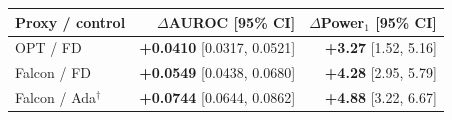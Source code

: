 \begin{tabular}{@{}lrr@{}}
\toprule
Proxy / control & $\Delta$AUROC [95\% CI] & $\Delta$Power$_1$ [95\% CI] \\
\midrule
OPT / FD & \textbf{+0.0410} [0.0317, 0.0521] & \textbf{+3.27} [1.52, 5.16] \\
Falcon / FD & \textbf{+0.0549} [0.0438, 0.0680] & \textbf{+4.28} [2.95, 5.79] \\
Falcon / Ada$^\dagger$ & \textbf{+0.0744} [0.0644, 0.0862] & \textbf{+4.88} [3.22, 6.67] \\
\bottomrule
\end{tabular}

